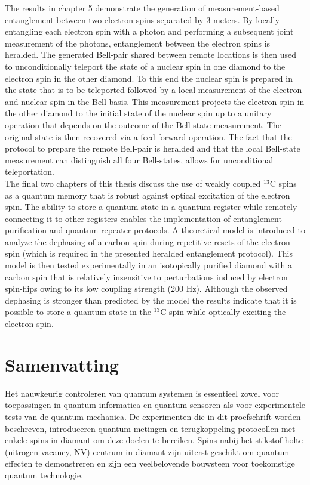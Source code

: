 The results in chapter 5 demonstrate the generation of measurement-based entanglement between two electron spins separated by 3 meters. By locally entangling each electron spin with a photon and performing a subsequent joint measurement of the photons, entanglement between the electron spins is heralded. The generated Bell-pair shared between remote locations is then used to unconditionally teleport the state of a nuclear spin in one diamond to the electron spin in the other diamond. To this end the nuclear spin is prepared in the state that is to be teleported followed by a local measurement of the electron and nuclear spin in the Bell-basis. This measurement projects the electron spin in the other diamond to the initial state of the nuclear spin up to a unitary operation that depends on the outcome of the Bell-state measurement. The original state is then recovered via a feed-forward operation. The fact that the protocol to prepare the remote Bell-pair is heralded and that the local Bell-state measurement can distinguish all four Bell-states, allows for unconditional teleportation. \\

The final two chapters of this thesis discuss the use of weakly coupled $^{13}$C spins as a quantum memory that is robust against optical excitation of the electron spin. The ability to store a quantum state in a quantum register while remotely connecting it to other registers enables the implementation of entanglement purification and quantum repeater protocols. A theoretical model is introduced to analyze the dephasing of a carbon spin during repetitive resets of the electron spin (which is required in the presented heralded entanglement protocol). This model is then tested experimentally in an isotopically purified diamond with a carbon spin that is relatively insensitive to perturbations induced by electron spin-flips owing to its low coupling strength (200 Hz). Although the observed dephasing is stronger than predicted by the model the results indicate that it is possible to store a quantum state in the $^{13}$C spin while optically exciting the electron spin.

\chapter{Samenvatting}

Het nauwkeurig controleren van quantum systemen is essentieel zowel voor toepassingen in quantum informatica en quantum sensoren als voor experimentele tests van de quantum mechanica. De experimenten die in dit proefschrift worden beschreven, introduceren quantum metingen en terugkoppeling protocollen met enkele spins in diamant om deze doelen te bereiken. Spins nabij het stikstof-holte (nitrogen-vacancy, NV) centrum in diamant zijn uiterst geschikt om quantum effecten te demonstreren en zijn een veelbelovende bouwsteen voor toekomstige quantum technologie. \\

